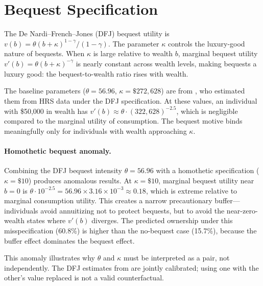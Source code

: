 \documentclass[12pt]{article}
\begin{document}
\section{Bequest Specification}
\label{app:bequest}

The De Nardi--French--Jones (DFJ) bequest utility is $v(b) = \theta (b + \kappa)^{1-\gamma}/(1-\gamma)$. The parameter $\kappa$ controls the luxury-good nature of bequests. When $\kappa$ is large relative to wealth $b$, marginal bequest utility $v'(b) = \theta(b + \kappa)^{-\gamma}$ is nearly constant across wealth levels, making bequests a luxury good: the bequest-to-wealth ratio rises with wealth.

The baseline parameters ($\theta = 56.96$, $\kappa = \$272{,}628$) are from \citet{lockwood2012}, who estimated them from HRS data under the DFJ specification. At these values, an individual with \$50,000 in wealth has $v'(b) \approx \theta \cdot (322{,}628)^{-2.5}$, which is negligible compared to the marginal utility of consumption. The bequest motive binds meaningfully only for individuals with wealth approaching $\kappa$.

\paragraph{Homothetic bequest anomaly.} Combining the DFJ bequest intensity $\theta = 56.96$ with a homothetic specification ($\kappa = \$10$) produces anomalous results. At $\kappa = \$10$, marginal bequest utility near $b = 0$ is $\theta \cdot 10^{-2.5} = 56.96 \times 3.16 \times 10^{-3} \approx 0.18$, which is extreme relative to marginal consumption utility. This creates a narrow precautionary buffer---individuals avoid annuitizing not to protect bequests, but to avoid the near-zero-wealth states where $v'(b)$ diverges. The predicted ownership under this misspecification (60.8\%) is higher than the no-bequest case (15.7\%), because the buffer effect dominates the bequest effect.

This anomaly illustrates why $\theta$ and $\kappa$ must be interpreted as a pair, not independently. The DFJ estimates from \citet{lockwood2012} are jointly calibrated; using one with the other's value replaced is not a valid counterfactual.


\end{document}
